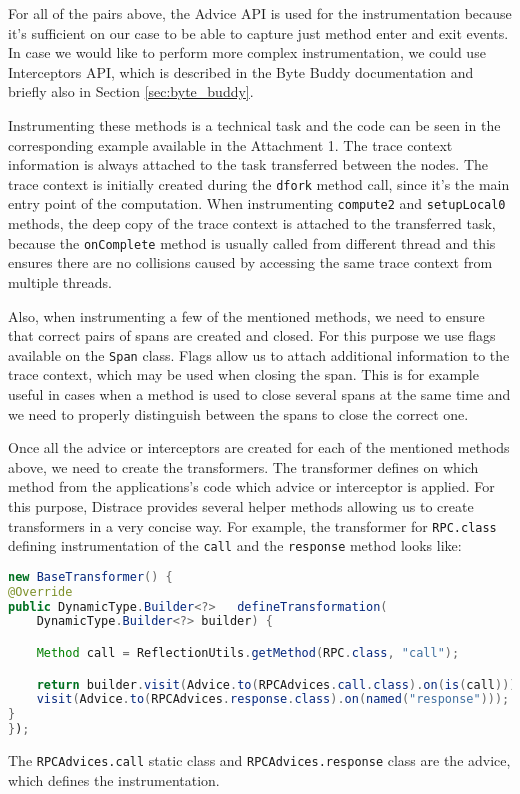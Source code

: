 For all of the pairs above, the Advice API is used for the instrumentation because it's sufficient on our case to be able to capture just method enter and exit events. In case we would like to perform more complex instrumentation, we could use Interceptors API, which is described in the Byte Buddy documentation and briefly also in Section \ref{sec:byte_buddy}.

Instrumenting these methods is a technical task and the code can be seen in the corresponding example available in the Attachment 1. The trace context information is always attached to the task transferred between the nodes. The trace context is initially created during the \texttt{dfork} method call, since it's the main entry point of the computation. When instrumenting \texttt{compute2} and \texttt{setupLocal0} methods, the deep copy of the trace context is attached to the transferred task, because the \texttt{onComplete} method is usually called from different thread and this ensures there are no collisions caused by accessing the same trace context from multiple threads.

Also, when instrumenting a few of the mentioned methods, we need to ensure that correct pairs of spans are created and closed. For this purpose we use flags available on the \texttt{Span} class. Flags allow us to attach additional information to the trace context, which may be used when closing the span. This is for example useful in cases when a method is used to close several spans at the same time and we need to properly distinguish between the spans to close the correct one.

Once all the advice or interceptors are created for each of the mentioned methods above, we need to create the transformers. The transformer defines on which method from the applications's code which advice or interceptor is applied. For this purpose, Distrace provides several helper methods allowing us to create transformers in a very concise way. For example, the transformer for \texttt{RPC.class} defining instrumentation of the \texttt{call} and the \texttt{response} method looks like:

\begin{lstlisting}[language=Java]
new BaseTransformer() {
@Override
public DynamicType.Builder<?> 	defineTransformation(
	DynamicType.Builder<?> builder) {

	Method call = ReflectionUtils.getMethod(RPC.class, "call");

	return builder.visit(Advice.to(RPCAdvices.call.class).on(is(call))).
	visit(Advice.to(RPCAdvices.response.class).on(named("response")));
}
});
\end{lstlisting}
The \texttt{RPCAdvices.call} static class and \texttt{RPCAdvices.response} class are the advice, which defines the instrumentation.

